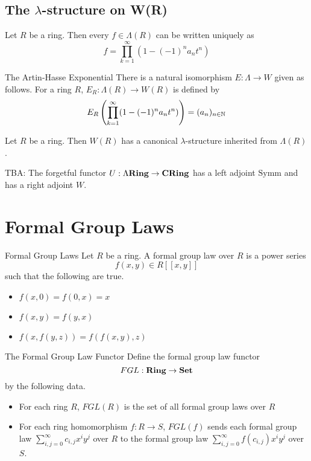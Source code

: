 \documentclass[a4paper]{article}
\begin{document}
\subsection{The $\lambda$-structure on W(R)}
\begin{lmm}{}{} Let $R$ be a ring. Then every $f\in\Lambda(R)$ can be written uniquely as $$f=\prod_{k=1}^\infty(1-(-1)^na_nt^n)$$
\end{lmm}

\begin{thm}{The Artin-Hasse Exponential}{} There is a natural isomorphism $E:\Lambda\rightarrow W$ given as follows. For a ring $R$, $E_R:\Lambda(R)\to W(R)$ is defined by $$E_R\left(\prod_{k=1}^\infty(1-(-1)^na_nt^n)\right)=(a_n)_{n\in\mathbb{N}}$$
\end{thm}

\begin{crl}{}{} Let $R$ be a ring. Then $W(R)$ has a canonical $\lambda$-structure inherited from $\Lambda(R)$. 
\end{crl}

TBA: The forgetful functor $U:\Lambda\bold{Ring}\to\bold{CRing}$ has a left adjoint $\text{Symm}$ and has a right adjoint $W$. 


\pagebreak
\section{Formal Group Laws}
\begin{defn}{Formal Group Laws}{} Let $R$ be a ring. A formal group law over $R$ is a power series $$f(x,y)\in R[[x,y]]$$ such that the following are true. 
\begin{itemize}
\item $f(x,0)=f(0,x)=x$
\item $f(x,y)=f(y,x)$
\item $f(x,f(y,z))=f(f(x,y),z)$
\end{itemize}
\end{defn}

\begin{defn}{The Formal Group Law Functor}{} Define the formal group law functor $$FGL:\bold{Ring}\to\bold{Set}$$ by the following data. 
\begin{itemize}
\item For each ring $R$, $FGL(R)$ is the set of all formal group laws over $R$
\item For each ring homomorphism $f:R\to S$, $FGL(f)$ sends each formal group law $\sum_{i,j=0}^\infty c_{i,j}x^iy^j$ over $R$ to the formal group law $\sum_{i,j=0}^\infty f(c_{i,j})x^iy^j$ over $S$. 
\end{itemize}
\end{defn}
\end{document}

